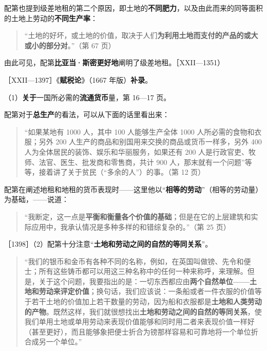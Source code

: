 配第也提到级差地租的第二个原因，即土地的\textbf{不同肥力}，以及由此而来的同等面积的土地上劳动的\textbf{不同生产率}：

\begin{quote}“土地的好坏，或土地的价值，取决于人们\textbf{为利用土地而支付的产品的或大或小的部分对}。”（第 67 页）\end{quote}

由此可见，配第\textbf{比亚当·斯密更好地}阐明了级差地租。［XXII—1351）


［XXII—1397］《\textbf{赋税论}》（1667 年版）\textbf{补录}。

（1）\textbf{关于}一国所必需的\textbf{流通货币}量，第 16—17 页。

配第对于\textbf{总生产}的看法，可以从下面的话里看出来：

\begin{quote}“如果某地有 1000 人，其中 100 人能够生产全体 1000 人所必需的食物和衣服；另外 200 人生产的商品和别国用来交换的商品或货币一样多，另外 400 人为全体居民的装饰、娱乐和华丽服务，如果还有 200 人是行政官吏、牧师、法官、医生、批发商和零售商，共计 900 人，那末就有一个问题”等等，接着讲了关于贫民（“多余的人”）的事。（第 12 页）\end{quote}

配第在阐述地租和地租的货币表现时——这里他以“\textbf{相等的劳动}”（相等的劳动量）为基础，——说道：

\begin{quote}“我断定，这一点是\textbf{平衡和衡量各个价值的基础}；但是在它的上层建筑和实际应用中，我承认情况是多种多样的和错综复杂的。”（第 25 页）\end{quote}

［1398］（2）配第十分注意“\textbf{土地和劳动之间的自然的等同关系}”。

\begin{quote}“我们的银币和金币有各种不同的名称，例如，在英国叫做镑、先令和便士；所有这些铸币都可以用这三种名称中的任何一种来称呼，来理解。但是，关于这个问题，我要指出的是：一切东西都应由\textbf{两个自然单位——土地和劳动来评定价值}；换句话，我们应该说：一条船或者一件衣服的价值等于若干土地的价值加上若干数量的劳动，因为船和衣服都是\textbf{土地和人类劳动的产物}。既然这样，我们就很想找出\textbf{土地和劳动之间的自然的等同关系}，使我们单用土地或单用劳动来表现价值能够和同时用二者来表现价值一样好（甚至更好），而且能够象把便士折合为镑那样容易和可靠地将一个单位折合成另一个单位。”\end{quote}

